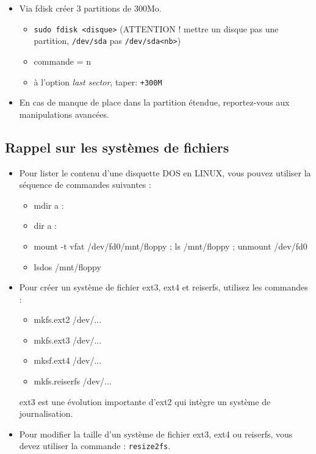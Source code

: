 \documentclass[a4paper]{article}
\begin{document}
\begin{itemize}
\item Via fdisk créer 3 partitions de 300Mo.
\begin{example}
    \begin{itemize}
        \item \texttt{sudo fdisk <disque>} (ATTENTION ! mettre un disque pas une partition, \texttt{/dev/sda} pas \texttt{/dev/sda<nb>})
        \item commande = n
        \item à l'option \textit{last sector}, taper: \texttt{+300M}
    \end{itemize}
\end{example}

\item En cas de manque de place dans la partition étendue, reportez-vous aux manipulations avancées.

\end{itemize}










\subsection{Rappel sur les systèmes de fichiers}





\begin{itemize}

\item Pour lister le contenu d’une disquette DOS en LINUX, vous pouvez utiliser la séquence de commandes suivantes :
\begin{itemize}
    \item mdir a :
    \item dir a :
    \item mount -t vfat /dev/fd0/mnt/floppy ; ls /mnt/floppy ; unmount /dev/fd0
    \item lsdos /mnt/floppy
\end{itemize}

\item Pour créer un système de fichier ext3, ext4 et reiserfs, utilisez les commandes :
\begin{itemize}
    \item mkfs.ext2 /dev/...
    \item mkfs.ext3 /dev/...
    \item mksf.ext4 /dev/...
    \item mkfs.reiserfs /dev/...
\end{itemize}
ext3 est une évolution importante d’ext2 qui intègre un système de journalisation.

\item Pour modifier la taille d’un système de fichier ext3, ext4 ou reiserfs, vous devez utiliser la commande : \texttt{resize2fs}.

\end{itemize}
\end{document}
